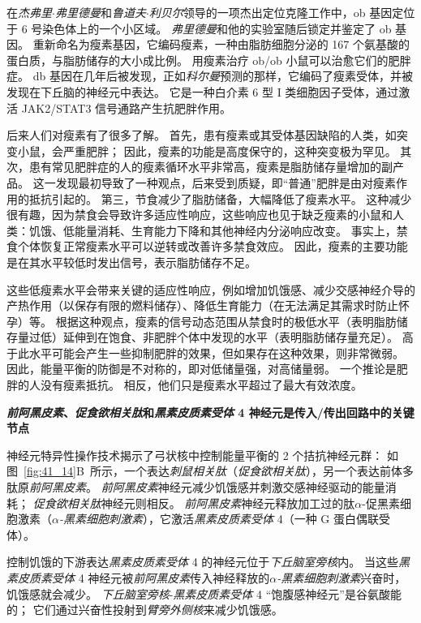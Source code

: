 在\textit{杰弗里$\cdot$弗里德曼}和\textit{鲁道夫$\cdot$利贝尔}领导的一项杰出定位克隆工作中，ob 基因定位于 6 号染色体上的一个小区域。
\textit{弗里德曼}和他的实验室随后锁定并鉴定了 ob 基因。
重新命名为瘦素基因，它编码瘦素，一种由脂肪细胞分泌的 167 个氨基酸的蛋白质，与脂肪储存的大小成比例。
用瘦素治疗 ob/ob 小鼠可以治愈它们的肥胖症。
db 基因在几年后被发现，正如\textit{科尔曼}预测的那样，它编码了瘦素受体，并被发现在下丘脑的神经元中表达。
它是一种白介素 6 型 I 类细胞因子受体，通过激活 JAK2/STAT3 信号通路产生抗肥胖作用。


后来人们对瘦素有了很多了解。
首先，患有瘦素或其受体基因缺陷的人类，如突变小鼠，会严重肥胖；
因此，瘦素的功能是高度保守的，这种突变极为罕见。
其次，患有常见肥胖症的人的瘦素循环水平非常高，瘦素是脂肪储存量增加的副产品。
这一发现最初导致了一种观点，后来受到质疑，即“普通”肥胖是由对瘦素作用的抵抗引起的。
第三，节食减少了脂肪储备，大幅降低了瘦素水平。
这种减少很有趣，因为禁食会导致许多适应性响应，这些响应也见于缺乏瘦素的小鼠和人类：饥饿、低能量消耗、生育能力下降和其他神经内分泌响应改变。
事实上，禁食个体恢复正常瘦素水平可以逆转或改善许多禁食效应。
因此，瘦素的主要功能是在其水平较低时发出信号，表示脂肪储存不足。


这些低瘦素水平会带来关键的适应性响应，例如增加饥饿感、减少交感神经介导的产热作用（以保存有限的燃料储存）、降低生育能力（在无法满足其需求时防止怀孕）等。
根据这种观点，瘦素的信号动态范围从禁食时的极低水平（表明脂肪储存量过低）延伸到在饱食、非肥胖个体中发现的水平（表明脂肪储存量充足）。
高于此水平可能会产生一些抑制肥胖的效果，但如果存在这种效果，则非常微弱。
因此，能量平衡的防御是不对称的，即对低储量强，对高储量弱。
一个推论是肥胖的人没有瘦素抵抗。
相反，他们只是瘦素水平超过了最大有效浓度。


\textbf{\textit{前阿黑皮素}、\textit{促食欲相关肽}和\textit{黑素皮质素受体} 4 神经元是传入/传出回路中的关键节点}

神经元特异性操作技术揭示了弓状核中控制能量平衡的 2 个拮抗神经元群：
如图~\ref{fig:41_14}B~所示，一个表达\textit{刺鼠相关肽}（\textit{促食欲相关肽}），另一个表达前体多肽原\textit{前阿黑皮素}。
\textit{前阿黑皮素}神经元减少饥饿感并刺激交感神经驱动的能量消耗；
\textit{促食欲相关肽}神经元则相反。
\textit{前阿黑皮素}神经元释放加工过的肽$\alpha$-促黑素细胞激素（\textit{$\alpha$-黑素细胞刺激素}），它激活\textit{黑素皮质素受体} 4（一种 G 蛋白偶联受体）。


控制饥饿的下游表达\textit{黑素皮质素受体} 4 的神经元位于\textit{下丘脑室旁核}内。
当这些\textit{黑素皮质素受体} 4 神经元被\textit{前阿黑皮素}传入神经释放的\textit{$\alpha$-黑素细胞刺激素}兴奋时，饥饿感就会减少。
\textit{下丘脑室旁核}-\textit{黑素皮质素受体} 4 “饱腹感神经元”是谷氨酸能的；
它们通过兴奋性投射到\textit{臂旁外侧核}来减少饥饿感。


